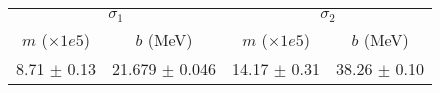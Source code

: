 \begin{tabular}{cc|cc}
\multicolumn{2}{c|}{$\sigma_1$} & \multicolumn{2}{|c}{$\sigma_2$} \\
$m$ ($\times1e5$) & $b$ (MeV) & $m$ ($\times1e5$) & $b$ (MeV) \\
\hline
8.71 $\pm$ 0.13 & 21.679 $\pm$ 0.046 & 14.17 $\pm$ 0.31 & 38.26 $\pm$ 0.10\\
\end{tabular}

